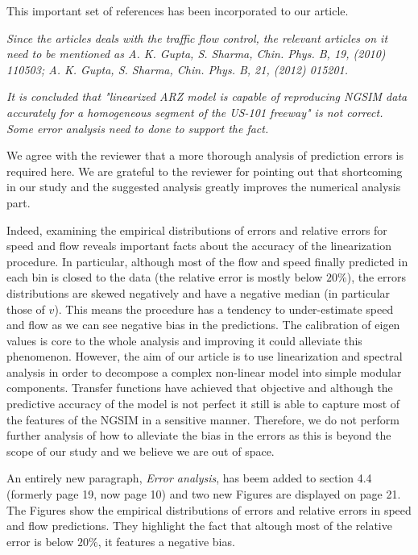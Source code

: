\documentclass{article}
\begin{document}
This important set of references has been incorporated to our article. 

\bigskip{}

\emph{
Since the articles deals with the traffic flow control, the relevant articles on it need to be mentioned as A. K. Gupta, S. Sharma, Chin. Phys. B, 19, (2010) 110503; A. K. Gupta, S. Sharma, Chin. Phys. B, 21, (2012) 015201.
}

\bigskip{}

\emph{
It is concluded that "linearized ARZ model is capable of reproducing NGSIM data accurately for a homogeneous segment of the US-101 freeway" is not correct. Some error analysis need to done to support the fact.
}

We agree with the reviewer that a more thorough analysis of prediction errors is required here. We are grateful to the reviewer for pointing out that shortcoming in our study and the suggested analysis greatly improves the numerical analysis part. 

Indeed, examining the empirical distributions of errors and relative errors for speed and flow reveals important facts about the accuracy of the linearization procedure. In particular, although most of the flow and speed finally predicted in each bin is closed to the data (the relative error is mostly below $20\%$), the errors distributions are skewed negatively and have a negative median (in particular those of $v$). This means the procedure has a tendency to under-estimate speed and flow as we can see negative bias in the predictions. The calibration of eigen values is core to the whole analysis and improving it could alleviate this phenomenon. However, the aim of our article is to use linearization and spectral analysis in order to decompose a complex non-linear model into simple modular components. Transfer functions have achieved that objective and although the predictive accuracy of the model is not perfect it still is able to capture most of the features of the NGSIM in a sensitive manner. Therefore, we do not perform further analysis of how to alleviate the bias in the errors as this is beyond the scope of our study and we believe we are out of space.

An entirely new paragraph, \textit{Error analysis}, has beem added to section 4.4 (formerly page 19, now page 10) and two new Figures are displayed on page 21. The Figures show the empirical distributions of errors and relative errors in speed and flow predictions. They highlight the fact that altough most of the relative error is below $20\%$, it features a negative bias. 
\end{document}
